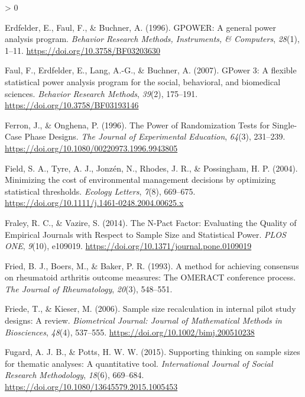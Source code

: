 \documentclass[
  english,
  ,jou,floatsintext]{apa6}
\newlength{\cslhangindent}
\newenvironment{CSLReferences}[2] %
 {%
  \setlength{\parindent}{0pt}
  \ifodd #1 \everypar{\setlength{\hangindent}{\cslhangindent}}\ignorespaces\fi
  \ifnum #2 > 0
  \setlength{\parskip}{#2\baselineskip}
  \fi
 }%
 {}
\begin{document}
\begin{CSLReferences}{1}{0}
\leavevmode\hypertarget{ref-erdfelder_gpower_1996}{}%
Erdfelder, E., Faul, F., \& Buchner, A. (1996). {GPOWER}: {A} general power analysis program. \emph{Behavior Research Methods, Instruments, \& Computers}, \emph{28}(1), 1--11. \url{https://doi.org/10.3758/BF03203630}

\leavevmode\hypertarget{ref-faul_gpower_2007}{}%
Faul, F., Erdfelder, E., Lang, A.-G., \& Buchner, A. (2007). {GPower} 3: {A} flexible statistical power analysis program for the social, behavioral, and biomedical sciences. \emph{Behavior Research Methods}, \emph{39}(2), 175--191. \url{https://doi.org/10.3758/BF03193146}

\leavevmode\hypertarget{ref-ferron_power_1996}{}%
Ferron, J., \& Onghena, P. (1996). The {Power} of {Randomization Tests} for {Single-Case Phase Designs}. \emph{The Journal of Experimental Education}, \emph{64}(3), 231--239. \url{https://doi.org/10.1080/00220973.1996.9943805}

\leavevmode\hypertarget{ref-field_minimizing_2004}{}%
Field, S. A., Tyre, A. J., Jonzén, N., Rhodes, J. R., \& Possingham, H. P. (2004). Minimizing the cost of environmental management decisions by optimizing statistical thresholds. \emph{Ecology Letters}, \emph{7}(8), 669--675. \url{https://doi.org/10.1111/j.1461-0248.2004.00625.x}

\leavevmode\hypertarget{ref-fraley_n-pact_2014}{}%
Fraley, R. C., \& Vazire, S. (2014). The {N-Pact Factor}: {Evaluating} the {Quality} of {Empirical Journals} with {Respect} to {Sample Size} and {Statistical Power}. \emph{PLOS ONE}, \emph{9}(10), e109019. \url{https://doi.org/10.1371/journal.pone.0109019}

\leavevmode\hypertarget{ref-fried_method_1993}{}%
Fried, B. J., Boers, M., \& Baker, P. R. (1993). A method for achieving consensus on rheumatoid arthritis outcome measures: The {OMERACT} conference process. \emph{The Journal of Rheumatology}, \emph{20}(3), 548--551.

\leavevmode\hypertarget{ref-friede_sample_2006}{}%
Friede, T., \& Kieser, M. (2006). Sample size recalculation in internal pilot study designs: A review. \emph{Biometrical Journal: Journal of Mathematical Methods in Biosciences}, \emph{48}(4), 537--555. \url{https://doi.org/10.1002/bimj.200510238}

\leavevmode\hypertarget{ref-fugard_supporting_2015}{}%
Fugard, A. J. B., \& Potts, H. W. W. (2015). Supporting thinking on sample sizes for thematic analyses: A quantitative tool. \emph{International Journal of Social Research Methodology}, \emph{18}(6), 669--684. \url{https://doi.org/10.1080/13645579.2015.1005453}


\end{CSLReferences}
\end{document}
